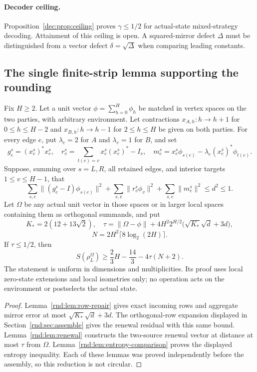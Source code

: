 \paragraph{Decoder ceiling.}
Proposition~\ref{dec:prop:ceiling} proves $\gamma\le1/2$ for actual-state mixed-strategy decoding. Attainment of this ceiling is open. A squared-mirror defect $\Delta$ must be distinguished from a vector defect $\delta=\sqrt\Delta$ when comparing leading constants.

\subsection{The single finite-strip lemma supporting the rounding}\label{rnd:sec:central}
\begin{lemma}\label{rnd:lem:central}
Fix $H\ge2$. Let a unit vector $\phi=\sum_{h=0}^H\phi_h$ be matched in vertex spaces on the two parties, with arbitrary environment. Let contractions $x_{A,h}:h\to h+1$ for $0\le h\le H-2$ and $x_{B,h}:h\to h-1$ for $2\le h\le H$ be given on both parties. For every edge $e$, put $\lambda_e=2$ for $A$ and $\lambda_e=1$ for $B$, and set
\[
 g_e^s=(x_e^s)^*x_e^s,\quad
 r_v^s=\sum_{t(e)=v}x_e^s(x_e^s)^*-I_v,\quad
 m_e^s=x_e^s\phi_{s(e)}-\lambda_e(x_e^{\bar s})^*\phi_{t(e)}.
\]
Suppose, summing over $s=L,R$, all retained edges, and interior targets $1\le v\le H-1$, that
\[
 \sum_{s,e}\|(g_e^s-I)\phi_{s(e)}\|^2
 +\sum_{s,v}\|r_v^s\phi_v\|^2
 +\sum_{s,e}\|m_e^s\|^2\le d^2\le1.
\]
Let $\Omega$ be any actual unit vector in those spaces or in larger local spaces containing them as orthogonal summands, and put
\[
 K_*=2(12+13\sqrt2),\quad
 \tau=\|\Omega-\phi\|+
 4H^2 2^{H/2}\bigl(\sqrt{K_*}\sqrt d+3d\bigr),
\]
\[
 N=2H^2\lceil8\log_2(2H)\rceil.
\]
If $\tau\le1/2$, then
\[
 \boxed{\displaystyle
 S(\rho_L^\Omega)\ge\frac23H-\frac{14}{3}-4\tau(N+2).}
\]
The statement is uniform in dimensions and multiplicities. Its proof uses local zero-state extensions and local isometries only; no operation acts on the environment or postselects the actual state.
\end{lemma}
\begin{proof}
Lemma~\ref{rnd:lem:row-repair} gives exact incoming rows and aggregate mirror error at most $\sqrt{K_*}\sqrt d+3d$. The orthogonal-row expansion displayed in Section~\ref{rnd:sec:assemble} gives the renewal residual with this same bound. Lemma~\ref{rnd:lem:renewal} constructs the two-source renewal vector at distance at most $\tau$ from $\Omega$. Lemma~\ref{rnd:lem:entropy-comparison} proves the displayed entropy inequality. Each of these lemmas was proved independently before the assembly, so this reduction is not circular.
\end{proof}

